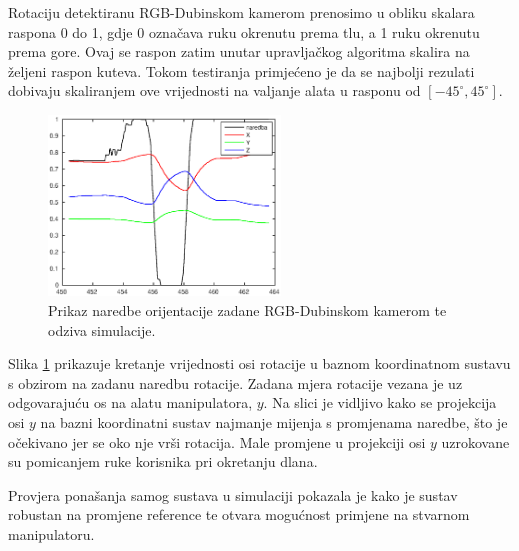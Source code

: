\documentclass[times, utf8, diplomski, numeric]{fer}
\begin{document}
Rotaciju detektiranu RGB-Dubinskom kamerom prenosimo u obliku skalara raspona 0 do 1, gdje 0 označava ruku okrenutu prema tlu, a 1 ruku okrenutu prema gore.
Ovaj se raspon zatim unutar upravljačkog algoritma skalira na željeni raspon kuteva. 
Tokom testiranja primjećeno je da se najbolji rezulati dobivaju skaliranjem ove vrijednosti na valjanje alata u rasponu od $[-45^{\circ} , 45^{\circ}]$.
\begin{figure}[H]
\centering
\includegraphics[width=0.55\textwidth]{rot_gazebo_0002}
\caption{Prikaz naredbe orijentacije zadane RGB-Dubinskom kamerom te odziva simulacije.}
\label{fig:kinectsimkut}
\end{figure}

Slika \ref{fig:kinectsimkut} prikazuje kretanje vrijednosti osi rotacije u baznom koordinatnom sustavu s obzirom na zadanu naredbu rotacije.
Zadana mjera rotacije vezana je uz odgovarajuću os na alatu manipulatora, $y$.
Na slici je vidljivo kako se projekcija osi $y$ na bazni koordinatni sustav najmanje mijenja s promjenama naredbe, što je očekivano jer se oko nje vrši rotacija.
Male promjene u projekciji osi $y$ uzrokovane su  pomicanjem ruke korisnika pri okretanju dlana.

Provjera ponašanja samog sustava u simulaciji pokazala je kako je sustav robustan na promjene reference te otvara mogućnost primjene na stvarnom manipulatoru.
\end{document}
